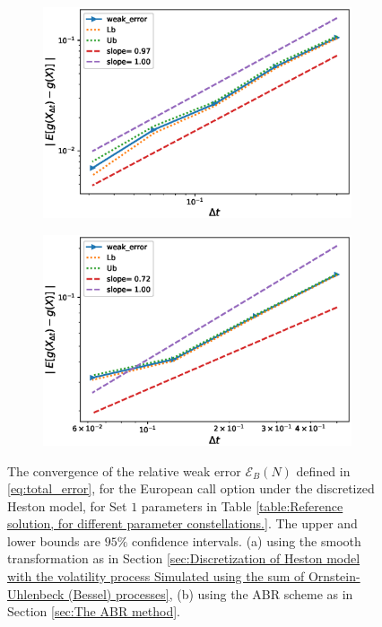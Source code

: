 \FloatBarrier
\begin{figure}[htb]
	\centering %
	\begin{subfigure}{0.4\textwidth}
		\includegraphics[width=\linewidth]{./figures/Heston_single_call_smooth_vol/weak_convergence/weak_convergence_order_single_call_option_heston_relative_M_4_10_6_beta_512_smooth_scheme_set1}
		\caption{}
		\label{fig:1}
	\end{subfigure}\hfil %
	\begin{subfigure}{0.4\textwidth}
		\includegraphics[width=\linewidth]{./figures/Heston_single_call_ABR_moment_matching/weak_convergence/weak_convergence_order_single_call_option_heston_relative_M_1_10_7_beta_128_ABR_set1}
		\caption{}
		\label{fig:2}
	\end{subfigure}\hfil %
	\caption{The convergence of the relative weak error  $\mathcal{E}_B(N)$ defined in \ref{eq:total_error}, for the European call option  under the discretized  Heston model, for Set $1$ parameters in Table \ref{table:Reference solution, for different parameter constellations.}. The upper and lower bounds are $95\%$ confidence intervals. (a) using the smooth transformation as in Section \ref{sec:Discretization of Heston model with the volatility process Simulated using the sum of  Ornstein-Uhlenbeck (Bessel) processes}, (b) using the ABR scheme as in Section \ref{sec:The ABR method}.}
	\label{fig:weak convergence comparison set 1}	
\end{figure}
\FloatBarrier
